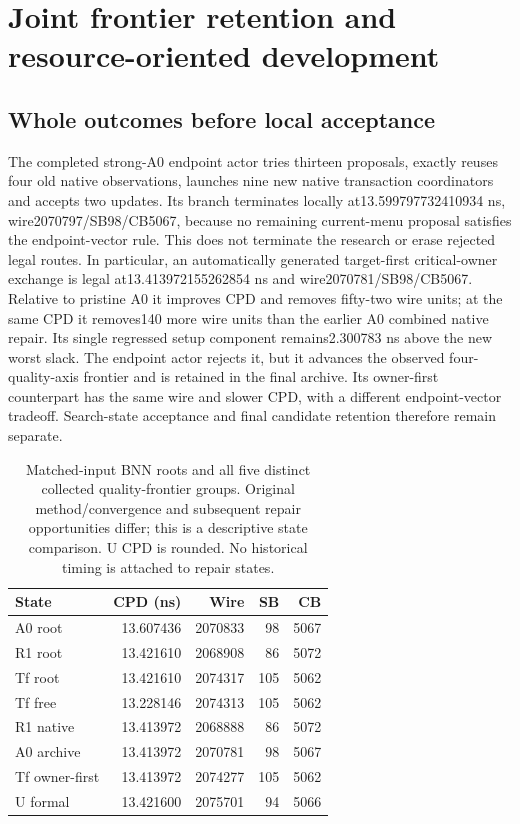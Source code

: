 
\section{Joint frontier retention and resource-oriented development}
\subsection{Whole outcomes before local acceptance}
The completed strong-A0 endpoint actor tries thirteen proposals, exactly reuses four old native observations, launches nine new native transaction coordinators and accepts two updates. Its branch terminates locally at13.599797732410934 ns, wire2070797/SB98/CB5067, because no remaining current-menu proposal satisfies the endpoint-vector rule. This does not terminate the research or erase rejected legal routes. In particular, an automatically generated target-first critical-owner exchange is legal at13.413972155262854 ns and wire2070781/SB98/CB5067. Relative to pristine A0 it improves CPD and removes fifty-two wire units; at the same CPD it removes140 more wire units than the earlier A0 combined native repair. Its single regressed setup component remains2.300783 ns above the new worst slack. The endpoint actor rejects it, but it advances the observed four-quality-axis frontier and is retained in the final archive. Its owner-first counterpart has the same wire and slower CPD, with a different endpoint-vector tradeoff. Search-state acceptance and final candidate retention therefore remain separate.

\begin{table}[t]
\centering\small
\caption{Matched-input BNN roots and all five distinct collected quality-frontier groups. Original method/convergence and subsequent repair opportunities differ; this is a descriptive state comparison. U CPD is rounded. No historical timing is attached to repair states.}
\begin{tabular}{lrrrr}
\hline
State & CPD (ns) & Wire & SB & CB\\
\hline
A0 root & 13.607436 & 2070833 & 98 & 5067\\
R1 root & 13.421610 & 2068908 & 86 & 5072\\
Tf root & 13.421610 & 2074317 & 105 & 5062\\
Tf free & 13.228146 & 2074313 & 105 & 5062\\
R1 native & 13.413972 & 2068888 & 86 & 5072\\
A0 archive & 13.413972 & 2070781 & 98 & 5067\\
Tf owner-first & 13.413972 & 2074277 & 105 & 5062\\
U formal & 13.421600 & 2075701 & 94 & 5066\\
\hline
\end{tabular}
\end{table}

